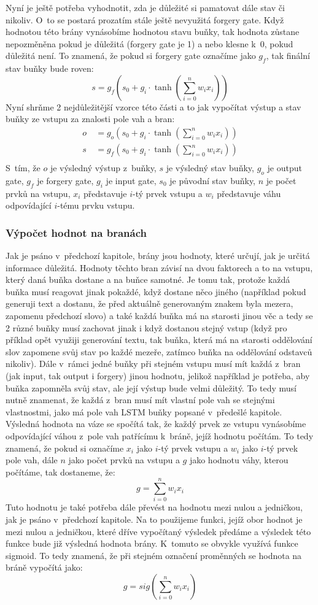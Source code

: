 \documentclass[a4paper]{article}
\begin{document}
Nyní je ještě potřeba vyhodnotit, zda je důležité si pamatovat dále stav či nikoliv. O~to se postará prozatím stále ještě nevyužitá forgery gate. Když hodnotou této brány vynásobíme hodnotou stavu buňky, tak hodnota zůstane nepozměněna pokud je důležitá (forgery gate je 1) a nebo klesne k~0, pokud důležitá není. To znamená, že pokud si forgery gate označíme jako $g_f$, tak finální stav buňky bude roven:$$s = g_f(s_0 + g_i\cdot\tanh(\sum\limits_{i = 0}^n w_ix_i))$$
Nyní shrňme 2 nejdůležitější vzorce této části a to jak vypočítat výstup a stav buňky ze vstupu za znalosti pole vah a bran:
\begin{align*}
	o~&= g_o(s_0 + g_i\cdot\tanh(\sum\limits_{i = 0}^n w_ix_i))\\
	s~&= g_f(s_0 + g_i\cdot\tanh(\sum\limits_{i = 0}^n w_ix_i))\\
\end{align*}
S~tím, že $o$ je výsledný výstup z~buňky, $s$ je výsledný stav buňky, $g_o$ je output gate, $g_f$ je forgery gate, $g_i$ je input gate, $s_0$ je původní stav buňky, $n$ je počet prvků na vstupu, $x_i$ představuje $i$-tý prvek vstupu a $w_i$ představuje váhu odpovídající $i$-tému prvku vstupu.
\par
\subsubsection{Výpočet hodnot na branách}
Jak je psáno v~předchozí kapitole, brány jsou hodnoty, které určují, jak je určitá informace důležitá. Hodnoty těchto bran závisí na dvou faktorech a to na vstupu, který daná buňka dostane a na buňce samotné. Je tomu tak, protože každá buňka musí reagovat jinak pokaždé, když dostane něco jiného (například pokud generuji text a dostanu, že před aktuálně generovaným znakem byla mezera, zapomenu předchozí slovo) a také každá buňka má na starosti jinou věc a tedy se 2 různé buňky musí zachovat jinak i když dostanou stejný vstup (když pro příklad opět využiji generování textu, tak buňka, která má na starosti oddělování slov zapomene svůj stav po každé mezeře, zatímco buňka na oddělování odstavců nikoliv). Dále v~rámci jedné buňky při stejném vstupu musí mít každá z~bran (jak input, tak output i forgery) jinou hodnotu, jelikož například je potřeba, aby buňka zapomněla svůj stav, ale její výstup bude velmi důležitý. To tedy musí nutně znamenat, že každá z~bran musí mít vlastní pole vah se stejnými vlastnostmi, jako má pole vah LSTM buňky popsané v~předešlé kapitole. Výsledná hodnota na váze se spočítá tak, že každý prvek ze vstupu vynásobíme odpovídající váhou z~pole vah patřícímu k~bráně, jejíž hodnotu počítám. To tedy znamená, že pokud si označíme $x_i$ jako $i$-tý prvek vstupu a $w_i$ jako $i$-tý prvek pole vah, dále $n$ jako počet prvků na vstupu a $g$ jako hodnotu váhy, kterou počítáme, tak dostaneme, že:$$g = \sum\limits_{i = 0}^n w_ix_i$$
Tuto hodnotu je také potřeba dále převést na hodnotu mezi nulou a jedničkou, jak je psáno v~předchozí kapitole. Na to použijeme funkci, jejíž obor hodnot je mezi nulou a jedničkou, které dříve vypočítaný výsledek předáme a výsledek této funkce bude již výsledná hodnota brány. K~tomuto se obvykle využívá funkce sigmoid. To tedy znamená, že při stejném označení proměnných se hodnota na bráně vypočítá jako:$$g = sig(\sum\limits_{i = 0}^n w_ix_i)$$
\end{document}
